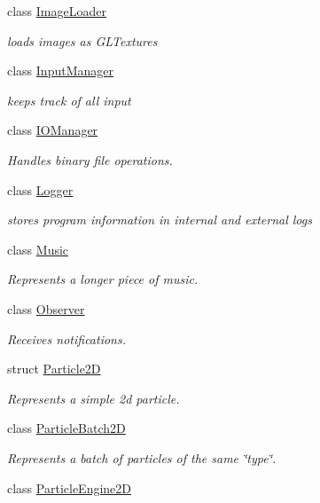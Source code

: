\begin{DoxyCompactItemize}
class \hyperlink{classnta_1_1ImageLoader}{Image\+Loader}
\begin{DoxyCompactList}\small\item\em loads images as G\+L\+Textures \end{DoxyCompactList}\item 
class \hyperlink{classnta_1_1InputManager}{Input\+Manager}
\begin{DoxyCompactList}\small\item\em keeps track of all input \end{DoxyCompactList}\item 
class \hyperlink{classnta_1_1IOManager}{I\+O\+Manager}
\begin{DoxyCompactList}\small\item\em Handles binary file operations. \end{DoxyCompactList}\item 
class \hyperlink{classnta_1_1Logger}{Logger}
\begin{DoxyCompactList}\small\item\em stores program information in internal and external logs \end{DoxyCompactList}\item 
class \hyperlink{classnta_1_1Music}{Music}
\begin{DoxyCompactList}\small\item\em Represents a longer piece of music. \end{DoxyCompactList}\item 
class \hyperlink{classnta_1_1Observer}{Observer}
\begin{DoxyCompactList}\small\item\em Receives notifications. \end{DoxyCompactList}\item 
struct \hyperlink{structnta_1_1Particle2D}{Particle2D}
\begin{DoxyCompactList}\small\item\em Represents a simple 2d particle. \end{DoxyCompactList}\item 
class \hyperlink{classnta_1_1ParticleBatch2D}{Particle\+Batch2D}
\begin{DoxyCompactList}\small\item\em Represents a batch of particles of the same \char`\"{}type\char`\"{}. \end{DoxyCompactList}\item 
class \hyperlink{classnta_1_1ParticleEngine2D}{Particle\+Engine2D}

\end{DoxyCompactItemize}
